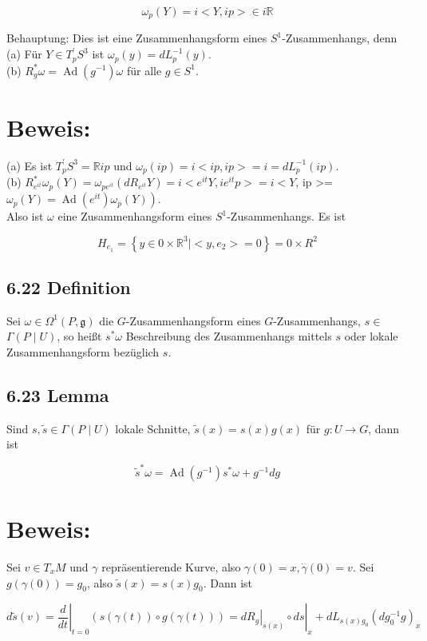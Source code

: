 $$
\omega_{p}(Y)=i<Y, i p>\in i \mathbb{R}
$$

Behauptung: Dies ist eine Zusammenhangsform eines $S^{1}$-Zusammenhangs, denn\\
(a) Für $Y \in T_{p}^{\prime} S^{3}$ ist $\omega_{p}(y)=d L_{p}^{-1}(y)$.\\
(b) $R_{g}^{*} \omega=\operatorname{Ad}\left(g^{-1}\right) \omega$ für alle $g \in S^{1}$.

\section*{Beweis:}
(a) Es ist $T_{p}^{\prime} S^{3}=\mathbb{R} i p$ und $\omega_{p}(i p)=i<i p, i p>=i=d L_{p}^{-1}(i p)$.\\
(b) $R_{e^{i t}}^{*} \omega_{p}(Y)=\omega_{p e^{i t}}\left(d R_{e^{i t}} Y\right)=i<e^{i t} Y, i e^{i t} p>=i<Y$, ip >= $\left.\omega_{p}(Y)=\operatorname{Ad}\left(e^{i t}\right) \omega_{p}(Y)\right)$.\\
Also ist $\omega$ eine Zusammenhangsform eines $S^{1}$-Zusammenhangs. Es ist

$$
H_{e_{1}}=\left\{y \in 0 \times \mathbb{R}^{3} \mid<y, e_{2}>=0\right\}=0 \times R^{2}
$$

\subsection*{6.22 Definition}
Sei $\omega \in \Omega^{1}(P, \mathfrak{g})$ die $G$-Zusammenhangsform eines $G$-Zusammenhangs, $s \in$ $\Gamma(P \mid U)$, so heißt $s^{*} \omega$ Beschreibung des Zusammenhangs mittels $s$ oder lokale Zusammenhangsform bezüglich $s$.

\subsection*{6.23 Lemma}
Sind $s, \tilde{s} \in \Gamma(P \mid U)$ lokale Schnitte, $\tilde{s}(x)=s(x) g(x)$ für $g: U \rightarrow G$, dann ist

$$
\tilde{s}^{*} \omega=\operatorname{Ad}\left(g^{-1}\right) s^{*} \omega+g^{-1} d g
$$

\section*{Beweis:}
Sei $v \in T_{x} M$ und $\gamma$ repräsentierende Kurve, also $\gamma(0)=x, \dot{\gamma}(0)=v$. Sei $g(\gamma(0))=g_{0}$, also $\tilde{s}(x)=s(x) g_{0}$. Dann ist

$$
d \tilde{s}(v)=\left.\frac{d}{d t}\right|_{t=0}(s(\gamma(t)) \circ g(\gamma(t)))=\left.\left.d R_{g}\right|_{s(x)} \circ d s\right|_{x}+d L_{s(x) g_{0}}\left(d g_{0}^{-1} g\right)_{x}
$$

